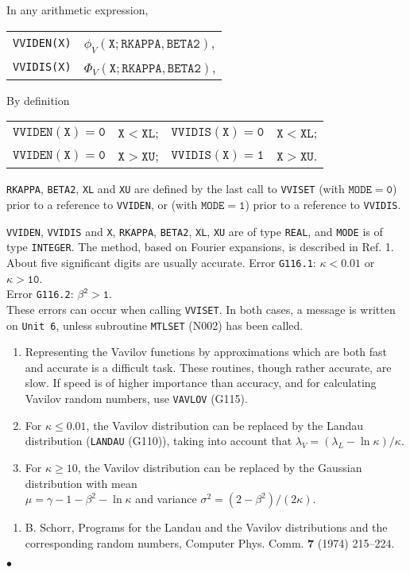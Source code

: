 In any arithmetic expression,
\begin{center}
\begin{tabular}{r@{\qquad has the value \qquad}l}
{\tt VVIDEN(X)} & $\phi_V(\mathtt{X;RKAPPA,BETA2})$, \\
{\tt VVIDIS(X)} & $\Phi_V(\mathtt{X;RKAPPA,BETA2})$,
\end{tabular} \end{center}
\newpage
By definition
\begin{center}
\begin{tabular}{r@{\quad if \quad}l@{\qquad}r@{\quad if \quad}l}
$\mathtt{VVIDEN(X)=0}$ & $\mathtt{X<XL}$; &
$\mathtt{VVIDIS(X)=0}$ & $\mathtt{X<XL}$; \\
$\mathtt{VVIDEN(X)=0}$ & $\mathtt{X>XU}$; &
$\mathtt{VVIDIS(X)=1}$ & $\mathtt{X>XU}$.
\end{tabular} \end{center}
\par
{\tt RKAPPA}, {\tt BETA2}, {\tt XL} and {\tt XU} are defined by the last
call to {\tt VVISET} (with $\mathtt{MODE=0}$) prior to a reference
to {\tt VVIDEN}, or (with $\mathtt{MODE=1}$) prior to a reference
to {\tt VVIDIS}.
\par
{\tt VVIDEN}, {\tt VVIDIS}
and {\tt X}, {\tt RKAPPA}, {\tt BETA2}, {\tt XL}, {\tt XU} are of type
{\tt REAL}, and {\tt MODE} is of type {\tt INTEGER}.
\Method
The method, based on Fourier expansions, is described in Ref. 1.
\Accuracy
About five significant digits are usually accurate.
\Errorh
Error {\tt G116.1}: $\mathtt{\kappa<0.01}$ or $\mathtt{\kappa>10}$. \\
Error {\tt G116.2}: $\mathtt{\beta^2>1}$. \\
These errors can occur when calling {\tt VVISET}. In both cases,
a message is written on {\tt Unit 6}, unless subroutine {\tt MTLSET}
(N002) has been called.
\Notes
\begin{enumerate}
\item Representing the Vavilov functions by approximations which are
both fast and accurate is a difficult task. These
routines, though rather accurate, are slow. If speed
is of higher importance than accuracy, and for calculating Vavilov
random numbers, use {\tt VAVLOV} (G115).
\item For $\kappa \le 0.01$, the Vavilov distribution can be
replaced by the Landau distribution ({\tt LANDAU} (G110)),
taking into account that $\lambda_V=(\lambda_L-\ln \kappa)/\kappa$.
\item For $\kappa \ge 10$, the Vavilov distribution can be
replaced by the Gaussian distribution with mean \\
$\mu=\gamma -1-\beta^2-\ln \kappa$ and variance
$\sigma^2=(2-\beta^2)/(2\kappa)$.
\end{enumerate}
\Refer
\begin{enumerate}
\item B. Schorr, Programs for the Landau and the Vavilov distributions
and the corresponding random numbers,
Computer Phys. Comm. {\bf 7} (1974) 215--224.
\end{enumerate}
$\bullet$
